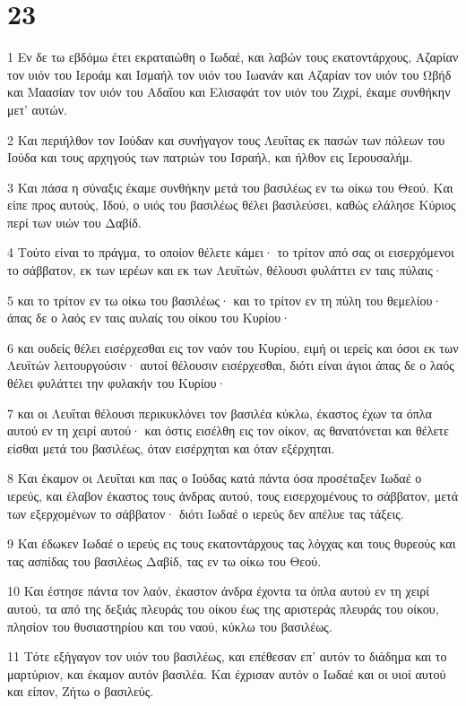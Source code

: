 \chapter{23}

\par 1 Εν δε τω εβδόμω έτει εκραταιώθη ο Ιωδαέ, και λαβών τους εκατοντάρχους, Αζαρίαν τον υιόν του Ιεροάμ και Ισμαήλ τον υιόν του Ιωανάν και Αζαρίαν τον υιόν του Ωβήδ και Μαασίαν τον υιόν του Αδαΐου και Ελισαφάτ τον υιόν του Ζιχρί, έκαμε συνθήκην μετ' αυτών.
\par 2 Και περιήλθον τον Ιούδαν και συνήγαγον τους Λευΐτας εκ πασών των πόλεων του Ιούδα και τους αρχηγούς των πατριών του Ισραήλ, και ήλθον εις Ιερουσαλήμ.
\par 3 Και πάσα η σύναξις έκαμε συνθήκην μετά του βασιλέως εν τω οίκω του Θεού. Και είπε προς αυτούς, Ιδού, ο υιός του βασιλέως θέλει βασιλεύσει, καθώς ελάλησε Κύριος περί των υιών του Δαβίδ.
\par 4 Τούτο είναι το πράγμα, το οποίον θέλετε κάμει· το τρίτον από σας οι εισερχόμενοι το σάββατον, εκ των ιερέων και εκ των Λευϊτών, θέλουσι φυλάττει εν ταις πύλαις·
\par 5 και το τρίτον εν τω οίκω του βασιλέως· και το τρίτον εν τη πύλη του θεμελίου· άπας δε ο λαός εν ταις αυλαίς του οίκου του Κυρίου·
\par 6 και ουδείς θέλει εισέρχεσθαι εις τον ναόν του Κυρίου, ειμή οι ιερείς και όσοι εκ των Λευϊτών λειτουργούσιν· αυτοί θέλουσιν εισέρχεσθαι, διότι είναι άγιοι άπας δε ο λαός θέλει φυλάττει την φυλακήν του Κυρίου·
\par 7 και οι Λευΐται θέλουσι περικυκλόνει τον βασιλέα κύκλω, έκαστος έχων τα όπλα αυτού εν τη χειρί αυτού· και όστις εισέλθη εις τον οίκον, ας θανατόνεται και θέλετε είσθαι μετά του βασιλέως, όταν εισέρχηται και όταν εξέρχηται.
\par 8 Και έκαμον οι Λευΐται και πας ο Ιούδας κατά πάντα όσα προσέταξεν Ιωδαέ ο ιερεύς, και έλαβον έκαστος τους άνδρας αυτού, τους εισερχομένους το σάββατον, μετά των εξερχομένων το σάββατον· διότι Ιωδαέ ο ιερεύς δεν απέλυε τας τάξεις.
\par 9 Και έδωκεν Ιωδαέ ο ιερεύς εις τους εκατοντάρχους τας λόγχας και τους θυρεούς και τας ασπίδας του βασιλέως Δαβίδ, τας εν τω οίκω του Θεού.
\par 10 Και έστησε πάντα τον λαόν, έκαστον άνδρα έχοντα τα όπλα αυτού εν τη χειρί αυτού, τα από της δεξιάς πλευράς του οίκου έως της αριστεράς πλευράς του οίκου, πλησίον του θυσιαστηρίου και του ναού, κύκλω του βασιλέως.
\par 11 Τότε εξήγαγον τον υιόν του βασιλέως, και επέθεσαν επ' αυτόν το διάδημα και το μαρτύριον, και έκαμον αυτόν βασιλέα. Και έχρισαν αυτόν ο Ιωδαέ και οι υιοί αυτού και είπον, Ζήτω ο βασιλεύς.

